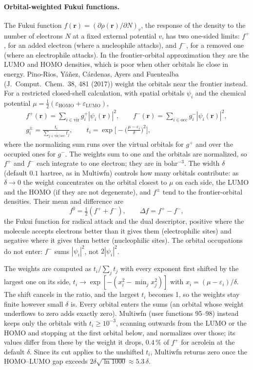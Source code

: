 \documentclass[11pt,a4paper]{article}
\begin{document}
\paragraph{Orbital-weighted Fukui functions.} The Fukui function
$f(\mathbf r)=(\partial\rho(\mathbf r)/\partial N)_v$, the response of the
density to the number of electrons $N$ at a fixed external potential $v$,
has two one-sided limits: $f^+$, for an added electron (where a nucleophile
attacks), and $f^-$, for a removed one (where an electrophile attacks). In
the frontier-orbital approximation they are the LUMO and HOMO densities,
which is poor when other orbitals lie close in energy. Pino-Rios, Y\'a\~nez,
C\'ardenas, Ayers and Fuentealba (J.~Comput.\ Chem.\ 38, 481 (2017))
weight the orbitals near the frontier instead. For a restricted
closed-shell calculation, with spatial orbitals $\psi_i$ and the chemical
potential $\mu=\frac12(\varepsilon_{\mathrm{HOMO}}+\varepsilon_{\mathrm{LUMO}})$,
\begin{gather}
 f^+(\mathbf r)=\sum_{i\in\mathrm{vir}}g_i^+|\psi_i(\mathbf r)|^2,\qquad
 f^-(\mathbf r)=\sum_{i\in\mathrm{occ}}g_i^-|\psi_i(\mathbf r)|^2,\\
 g_i^\pm=\frac{t_i}{\sum_{j\in\mathrm{vir/occ}}t_j},\qquad
 t_i=\exp\!\Big[-\Big(\frac{\mu-\varepsilon_i}{\delta}\Big)^2\Big],
\end{gather}
where the normalizing sum runs over the virtual orbitals for $g^+$ and over
the occupied ones for $g^-$. The weights sum to one and the orbitals are
normalized, so $f^+$ and $f^-$ each integrate to one electron; they are
in bohr$^{-3}$. The width $\delta$ (default $0.1$ hartree, as in
Multiwfn) controls how many orbitals contribute: as $\delta\to0$ the
weight concentrates on the orbital closest to $\mu$ on each side, the LUMO
and the HOMO (if they are not degenerate), and $f^\pm$ tend to the
frontier-orbital densities. Their mean and difference are
\begin{equation}
 f^0=\tfrac12(f^++f^-),\qquad \Delta f=f^+-f^-,
\end{equation}
the Fukui function for radical attack and the dual descriptor, positive
where the molecule accepts electrons better than it gives them
(electrophilic sites) and negative where it gives them better
(nucleophilic sites). The orbital occupations do not enter: $f^-$ sums
$|\psi_i|^2$, not $2|\psi_i|^2$.

The weights are computed as $t_i/\sum_jt_j$ with every exponent first
shifted by the largest one on its side,
$t_i\to\exp[-(x_i^2-\min_jx_j^2)]$ with $x_i=(\mu-\varepsilon_i)/\delta$.
The shift cancels in the ratio, and the largest $t_i$ becomes 1, so the
weights stay finite however small $\delta$ is. Every orbital enters the
sums (an orbital whose weight underflows to zero adds exactly zero).
Multiwfn (user functions 95--98) instead keeps only the orbitals with
$t_i\ge10^{-3}$, scanning outwards from the LUMO or the HOMO and stopping
at the first orbital below, and normalizes over those; its values differ
from these by the weight it drops, $0.4\,\%$ of $f^+$ for acrolein at the
default $\delta$. Since its cut applies to the unshifted $t_i$, Multiwfn
returns zero once the HOMO--LUMO gap exceeds
$2\delta\sqrt{\ln1000}\approx5.3\,\delta$.
\end{document}
